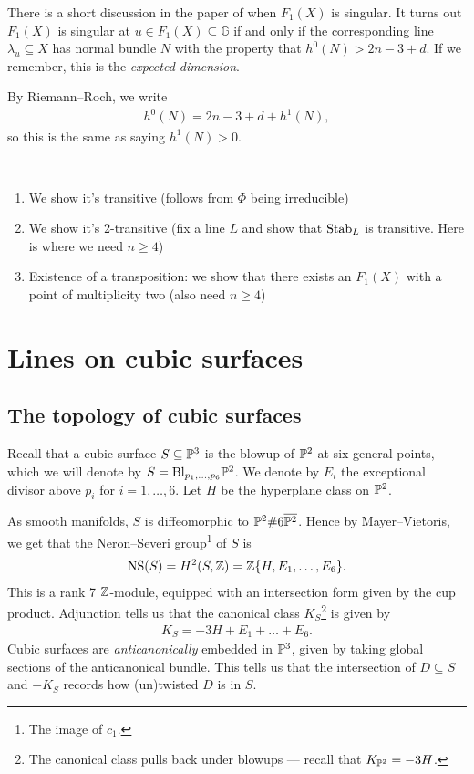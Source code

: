 \documentclass[11pt]{amsart}
\providecommand{\NS}{\mathrm{NS}}
\begin{document}
\begin{remark} There is a short discussion in the paper of when $F_1(X)$ is singular. It turns out $F_1(X)$ is singular at $u \in F_1(X) \subseteq \mathbb{G}$ if and only if the corresponding line $\lambda_u \subseteq X$ has normal bundle $N$ with the property that $h^0(N) > 2n-3+d$. If we remember, this is the \textit{expected dimension}.

By Riemann--Roch, we write
\begin{align*}
    h^0(N) = 2n-3+d + h^1(N),
\end{align*}
so this is the same as saying $h^1(N)>0$.
\end{remark}

\begin{remark} \,
\begin{enumerate}
    \item We show it's transitive (follows from $\Phi$ being irreducible)
    \item We show it's 2-transitive (fix a line $L$ and show that $\Stab_L$ is transitive. Here is where we need $n\ge 4$)
    \item Existence of a transposition: we show that there exists an $F_1(X)$ with a point of multiplicity two (also need $n\ge4$)
\end{enumerate}
\end{remark}

\section{Lines on cubic surfaces}

\subsection{The topology of cubic surfaces}

Recall that a cubic surface $S \subseteq \P^3$ is the blowup of $\P^2$ at six general points, which we will denote by $S = \Bl_{p_1, \ldots, p_6}\P^2$. We denote by $E_i$ the exceptional divisor above $p_i$ for $i=1, \ldots, 6$. Let $H$ be the hyperplane class on $\P^2$.

As smooth manifolds, $S$ is diffeomorphic to $\P^2\# 6\overline{\P^2}$. Hence by Mayer--Vietoris, we get that the Neron--Severi group\footnote{The image of $c_1$.} of $S$ is 
\begin{align*}
    \NS(S) = H^2(S,\Z) = \Z\{H,E_1, \ldots, E_6\}.
\end{align*}
This is a rank 7 $\Z$-module, equipped with an intersection form given by the cup product. Adjunction tells us that the canonical class $K_S$\footnote{The canonical class pulls back under blowups --- recall that $K_{\P^2} = -3H$.} is given by
\begin{align*}
    K_S = -3H + E_1 + \ldots + E_6.
\end{align*}
Cubic surfaces are \textit{anticanonically} embedded in $\P^3$, given by taking global sections of the anticanonical bundle. This tells us that the intersection of $D \subseteq S$ and $-K_S$ records how (un)twisted $D$ is in $S$.
\end{document}
